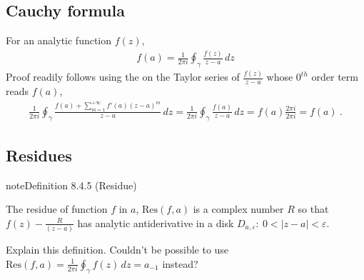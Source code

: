 \documentclass[letterpaper,10pt,english]{jupyterBook}
\begin{document}
\subsection{Cauchy formula}
\label{\detokenize{ch/complex/analysis:cauchy-formula}}\label{\detokenize{ch/complex/analysis:complex-analysis-mero-fun-cauchy-formula}}
\sphinxAtStartPar
For an analytic function \(f(z)\),
\begin{equation*}
\begin{split}f(a) = \frac{1}{2 \pi i} \oint_{\gamma} \frac{f(z)}{z-a} \, dz\end{split}
\end{equation*}
\sphinxAtStartPar
Proof readily follows using the {\hyperref[\detokenize{ch/complex/analysis:complex-analysis-useful-int-path-independence-z-n}]{}} on the Taylor series of \(\frac{f(z)}{z-a}\) whose \(0^{th}\) order term reads \(f(a)\),
\begin{equation*}
\begin{split}\frac{1}{2\pi i} \oint_{\gamma} \frac{f(a)+\sum_{m=1}^{+\infty} f'(a) (z-a)^m}{z-a} \, dz = \frac{1}{2\pi i} \oint_{\gamma} \frac{f(a)}{z-a} \, dz = f(a) \frac{2 \pi i}{2 \pi i} = f(a) \ .\end{split}
\end{equation*}

\subsection{Residues}
\label{\detokenize{ch/complex/analysis:residues}}\label{\detokenize{ch/complex/analysis:complex-analysis-mero-fun-residues}}\label{ch/complex/analysis:definition-5}
\begin{sphinxadmonition}{note}{Definition 8.4.5 (Residue)}



\sphinxAtStartPar
The residue of function \(f\) in \(a\), \(\text{Res}(f,a)\) is a complex number \(R\) so that \(f(z) - \frac{R}{(z-a)}\) has analytic antiderivative in a disk \(D_{a,\varepsilon}: \ 0 < |z-a| < \varepsilon\).
\end{sphinxadmonition}

\sphinxAtStartPar
{} Explain this definition. Couldn’t be possible to use \(\text{Res}(f,a) = \frac{1}{2 \pi i} \oint_{\gamma} f(z) \, dz = a_{-1}\) instead?
\end{document}
